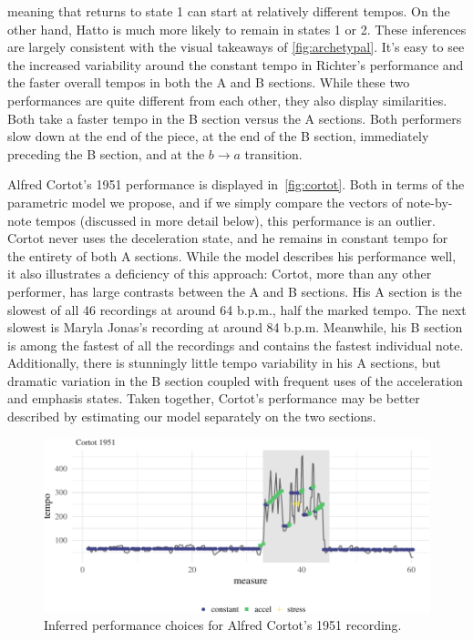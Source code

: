 \documentclass[aoas]{imsart}
\begin{document}
meaning that returns to state 1 can start at relatively different
tempos. On the other hand, Hatto is much more
likely to remain in states 1 or 2. These inferences are largely
consistent with the visual takeaways of \autoref{fig:archetypal}. It's
easy to see the increased variability around the constant tempo in
Richter's performance and the faster overall tempos in both the A and
B sections.
%
While these two performances are quite different from each other, they
also display similarities. Both take a faster tempo in the B
section versus the A sections. Both performers slow down at the end of
the piece, at the end of the B section, immediately preceding the B section, and at the
$b\rightarrow a$ transition.

Alfred Cortot's 1951 performance is displayed
in~\autoref{fig:cortot}. Both in terms of the parametric model we
propose, and if we simply compare the vectors of note-by-note tempos
(discussed in more detail below), this performance is an
outlier. Cortot never uses the deceleration state, and he remains in
constant tempo for the entirety of both A sections. While the model
describes his performance well, it also illustrates a deficiency of
this approach: Cortot, more than any other performer, has large
contrasts between the A and B sections. His A section is the slowest
of all 46 recordings at around 64 b.p.m., half the marked
tempo. The next slowest is Maryla Jonas's recording at around 84
b.p.m. Meanwhile, his B section is among the fastest of all the
recordings and contains the fastest individual note. Additionally,
there is stunningly little tempo variability in his A sections, but
dramatic variation in the B section coupled with frequent uses of the
acceleration and emphasis states. Taken together, Cortot's performance
may be better described by estimating our model separately on the two sections.
\begin{figure}[t]
  \centering
    \includegraphics[width=.9\textwidth]{cortot-performance-1}
  \caption{Inferred performance choices for Alfred Cortot's 1951
    recording.}
  \label{fig:cortot}
\end{figure}
\end{document}

